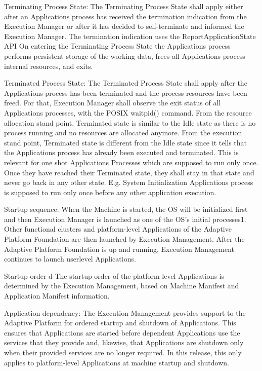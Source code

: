 \begin{DoxyItemize}
\begin{DoxyItemize}
\begin{DoxyItemize}
\item Terminating Process State\+: The Terminating Process State shall apply either after an Applications process has received the termination indication from the Execution Manager or after it has decided to self-\/terminate and informed the Execution Manager. The termination indication uses the Report\+Application\+State A\+PI On entering the Terminating Process State the Applications process performs persistent storage of the working data, frees all Applications process internal resources, and exits.
\item Terminated Process State\+: The Terminated Process State shall apply after the Applications process has been terminated and the process resources have been freed. For that, Execution Manager shall observe the exit status of all Applications processes, with the P\+O\+S\+IX waitpid() command. From the resource allocation stand point, Terminated state is similar to the Idle state as there is no process running and no resources are allocated anymore. From the execution stand point, Terminated state is different from the Idle state since it tells that the Applications process has already been executed and terminated. This is relevant for one shot Applications Processes which are supposed to run only once. Once they have reached their Terminated state, they shall stay in that state and never go back in any other state. E.\+g. System Initialization Applications process is supposed to run only once before any other application execution.
\end{DoxyItemize}
\item Startup sequence\+: When the Machine is started, the OS will be initialized first and then Execution Manager is launched as one of the O\+S’s initial processes1. Other functional clusters and platform-\/level Applications of the Adaptive Platform Foundation are then launched by Execution Management. After the Adaptive Platform Foundation is up and running, Execution Management continues to launch userlevel Applications.
\begin{DoxyItemize}
\item Startup order d The startup order of the platform-\/level Applications is determined by the Execution Management, based on Machine Manifest and Application Manifest information. 
\end{DoxyItemize}
\item Application dependency\+: The Execution Management provides support to the Adaptive Platform for ordered startup and shutdown of Applications. This ensures that Applications are started before dependent Applications use the services that they provide and, likewise, that Applications are shutdown only when their provided services are no longer required. In this release, this only applies to platform-\/level Applications at machine startup and shutdown.


\end{DoxyItemize}
\end{DoxyItemize}
